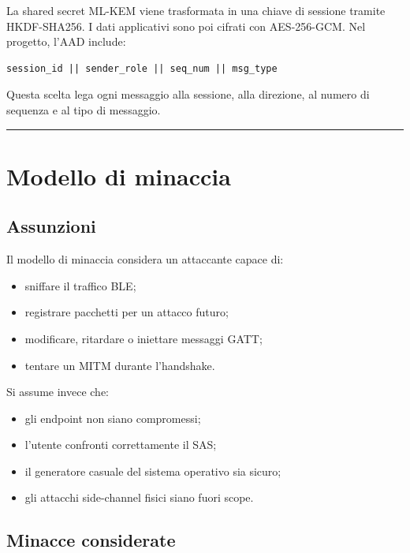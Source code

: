 \documentclass[11pt,a4paper]{article}
\providecommand{\tightlist}{\setlength{\itemsep}{0pt}\setlength{\parskip}{0pt}}
\begin{document}
La shared secret ML-KEM viene trasformata in una chiave di sessione
tramite HKDF-SHA256. I dati applicativi sono poi cifrati con
AES-256-GCM. Nel progetto, l'AAD include:

\begin{lstlisting}
session_id || sender_role || seq_num || msg_type
\end{lstlisting}

Questa scelta lega ogni messaggio alla sessione, alla direzione, al
numero di sequenza e al tipo di messaggio.

\begin{center}\rule{0.5\linewidth}{0.5pt}\end{center}

\section{Modello di minaccia}\label{capitolo-3---modello-di-minaccia}

\subsection{Assunzioni}\label{assunzioni}

Il modello di minaccia considera un attaccante capace di:

\begin{itemize}
\tightlist
\item
  sniffare il traffico BLE;
\item
  registrare pacchetti per un attacco futuro;
\item
  modificare, ritardare o iniettare messaggi GATT;
\item
  tentare un MITM durante l'handshake.
\end{itemize}

Si assume invece che:

\begin{itemize}
\tightlist
\item
  gli endpoint non siano compromessi;
\item
  l'utente confronti correttamente il SAS;
\item
  il generatore casuale del sistema operativo sia sicuro;
\item
  gli attacchi side-channel fisici siano fuori scope.
\end{itemize}

\subsection{Minacce considerate}\label{minacce-considerate}
\end{document}
